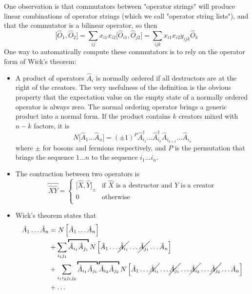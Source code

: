 \documentclass{report}
\begin{document}
One observation is that commutators between "operator strings" will produce linear combinations of operator strings (which we
call "operator string lists"), and that the commutator is a bilinear operator, so then
\begin{equation}
\Big[ \hat{O}_1, \hat{O}_2 \Big] = \sum_{ij} x_{i1} x_{i2} \Big[ \hat{O}_{i1}, \hat{O}_{j2} \Big] = \sum_{ijk} x_{i1} x_{i2} y_{ijk} \hat{O}_{k}
\end{equation}
One way to automatically compute these commutators is to rely on the operator form of Wick's theorem:
\begin{itemize}
\item A product of operators $\hat{A}_i$ is normally ordered if all destructors are at the right of the creators.
The very usefulness of the definition is the obvious property that the expectation value on the empty state
of a normally ordered operator is always zero.
The normal ordering operator brings a generic product into a normal form.  
If the product contains $k$ creators mixed with $n-k$ factors, it is
\begin{equation}
N \Big[ \hat{A}_1 \dots \hat{A}_n \Big] = (\pm 1)^P \hat{A}^\dagger_{i_1} \dots \hat{A}^\dagger_{i_k} \hat{A}_{i_{k+1}} \dots \hat{A}_{i_n}
\end{equation}
where $\pm$ for bosons and fermions respectively, and $P$ is the permutation that brings the sequence $1 \dots n$ to the sequence 
$i_1 \dots i_n$. 
\item The contraction between two operators is 
\begin{equation}
\overbracket{\hat{X} \hat{Y}}
= \left\{
\begin{array}{ll}
\big[ \hat{X} , \hat{Y} \big]_{\pm} & \mbox{if $\hat{X}$ is a destructor and $\hat{Y}$ is a creator} \\
0 & \mbox{otherwise} \\
\end{array}
\right.
\end{equation}
\item Wick's theorem states that
\begin{equation}
\begin{split}
\hat{A}_1 \dots \hat{A}_n &= N \left[ \hat{A}_1 \dots \hat{A}_n \right] \\
&+ \sum_{i_1 j_1} \overbracket{\hat{A}_{i_1} \hat{A}_{j_1}}
N \left[ \hat{A}_1 \dots \cancel{\hat{A}_{i_1}} \dots \cancel{\hat{A}_{j_1}} \dots  \hat{A}_n \right] \\
&+ \sum_{i_1 i_2 j_1 j_2} \overbracket{\hat{A}_{i_1} \hat{A}_{j_1}} \overbracket{\hat{A}_{i_2} \hat{A}_{j_2}}
N \left[ \hat{A}_1 \dots \cancel{\hat{A}_{i_1}} \dots \cancel{\hat{A}_{j_1}} \dots \cancel{\hat{A}_{i_2}} \dots \cancel{\hat{A}_{j_2}} \dots \hat{A}_n \right] \\
&+ \dots 
\end{split}
\end{equation}
\end{itemize}
\end{document}

